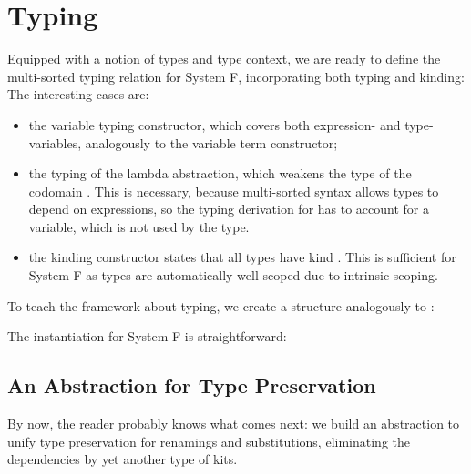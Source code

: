 \documentclass[sigplan,10pt, anonymous]{acmart}
\newenvironment{LibCode*}{%
  \begin{tcolorbox}[%
    colframe=white,%
    boxrule=0.0pt,%
    top=2.5pt,%
    left=2.5pt,%
    bottom=2.5pt,%
    right=2.5pt,%
    boxsep=0pt%
  ]\vspace{-0.2\baselineskip}%
}{%
  \vspace{-1\baselineskip}%
  \end{tcolorbox}%
}
\newcommand*\LibCode[1]{\begin{LibCode*}{#1}\end{LibCode*}}
\newcommand*\AppCode[1]{{#1}}
\newcommand*\ACode[1]{\AgdaFontStyle{\textcolor{mygray}{#1}}}
\newcommand*\ACon[1]{\AgdaInductiveConstructor{#1}}
\begin{document}
  \section{Typing}
  \label{sec:typing}
  Equipped with a notion of types and type context, we are ready to define
  the multi-sorted typing relation for System F, incorporating both
  typing and kinding:
  \AppCode\FTyping
  The interesting cases are:
  \begin{itemize}
  \item
    the variable typing constructor, which covers both expression- and
    type-variables, analogously to the variable term constructor;
  \item
    the typing \ACode{\ACon{⊢λ}} of the lambda abstraction, which
    weakens the type of the codomain \ACode{t₂}.
    This is necessary, because multi-sorted syntax allows types
    to depend on expressions, so the typing derivation for \ACode{e}
    has to account for a variable, which is not used by the type.
  \item
    the kinding constructor \ACode{\ACon{⊢τ}} states that all types
    have kind \ACode{\ACon{★}}. This is sufficient for System F as types
    are automatically well-scoped due to intrinsic scoping.
  \end{itemize}
  To teach the framework about typing, we create a structure analogously to
  \ACode{\ACon{Syntax}}:
  \LibCode\KTyping
  The instantiation for System F is straightforward:
  \AppCode\FTypingInst

  \subsection{An Abstraction for Type Preservation}
  By now, the reader probably knows what comes next: we build an
  abstraction to unify type preservation for renamings and substitutions,
  eliminating the dependencies by yet another type of kits.
\end{document}
